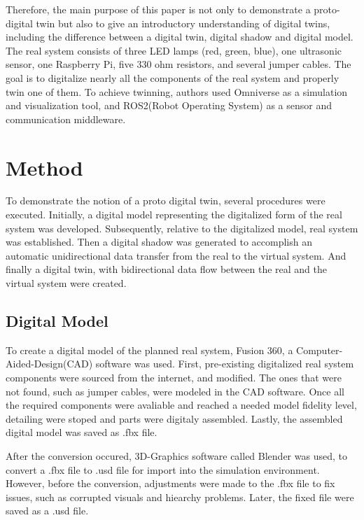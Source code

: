 \documentclass[conference]{IEEEtran}
\begin{document}
    Therefore, the main purpose of this paper is not only to demonstrate a proto-digital twin but also to give an introductory 
    understanding of digital twins, including the difference between a digital twin, digital shadow and digital model. The real system consists of three LED lamps (red, green, blue),
    one ultrasonic sensor, one Raspberry Pi, five 330 ohm resistors, and several jumper cables.
    The goal is to digitalize nearly all the components of the real system and properly twin one of them. To achieve twinning, 
    authors used Omniverse as a simulation and visualization tool, and ROS2(Robot Operating System) as a sensor and communication middleware. 
    \section{Method}\label{section:components}
    To demonstrate the notion of a proto digital twin, several procedures were executed.
    Initially, a digital model representing the digitalized form of the real system was developed.
    Subsequently, relative to the  digitalized model, real system was established.
    Then a digital shadow was generated to accomplish an automatic unidirectional data transfer 
    from the real to the virtual system. And finally a digital twin, with  
    bidirectional data flow between the real and the virtual system were created.  

    \subsection*{Digital Model}\label{section:digital_model}
    To create a digital model of the planned real system, Fusion 360, a  
    Computer-Aided-Design(CAD) software was used. First, 
    pre-existing digitalized real system components were sourced from the internet,
    and modified. The ones that were not found, such as jumper cables, were modeled in the CAD software. 
    Once all the required components were avaliable and reached a needed  model fidelity level,
    detailing were stoped and parts were digitaly assembled. 
    Lastly, the assembled digital model was saved as .fbx file.

    After the conversion occured, 3D-Graphics software called Blender was used, to convert 
    a .fbx file to .usd file for import  into the simulation environment. 
    However, before the conversion, adjustments were made to the .fbx file to fix issues, 
    such as corrupted visuals and hiearchy problems. Later, the fixed file were saved as a .usd file. 
\end{document}
